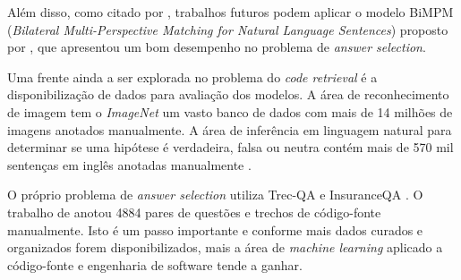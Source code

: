 \documentclass[12pt]{article}
\begin{document}
Além disso, como citado por \cite{lai-etal-2018-review}, trabalhos futuros podem aplicar o modelo BiMPM (\textit{Bilateral Multi-Perspective Matching for Natural Language Sentences}) proposto por \cite{wang-BiMPM-2017}, que apresentou um bom desempenho no problema de \textit{answer selection}.

Uma frente ainda a ser explorada no problema do \textit{code retrieval} é a disponibilização de dados para avaliação dos modelos. A área de reconhecimento de imagem tem o \textit{ImageNet} \cite{imagenet_cvpr09} um vasto banco de dados com mais de 14 milhões de imagens anotados manualmente. A área de inferência em linguagem natural para determinar se uma hipótese é verdadeira, falsa ou neutra contém mais de 570 mil sentenças em inglês anotadas manualmente \cite{snli:emnlp2015}. 

O próprio problema de \textit{answer selection} utiliza Trec-QA \cite{wang-etal-2007-jeopardy} e InsuranceQA \cite{feng-answer-selection-2015}. O trabalho de \cite{Yao-staqc:2018} anotou 4884 pares de questões e trechos de código-fonte manualmente. Isto é um passo importante e conforme mais dados curados e organizados forem disponibilizados, mais a área de \textit{machine learning} aplicado a código-fonte e engenharia de software tende a ganhar.







\end{document}
